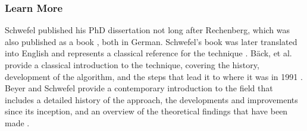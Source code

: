 % 
\subsubsection{Learn More}
Schwefel published his PhD dissertation \cite{Schwefel1975} not long after Rechenberg, which was also published as a book \cite{Schwefel1977}, both in German. Schwefel's book was later translated into English and represents a classical reference for the technique \cite{Schwefel1981}. 
B\"ack, et al. provide a classical introduction to the technique, covering the history, development of the algorithm, and the steps that lead it to where it was in 1991 \cite{Back1991}.
Beyer and Schwefel provide a contemporary introduction to the field that includes a detailed history of the approach, the developments and improvements since its inception, and an overview of the theoretical findings that have been made \cite{Beyer2002}.
